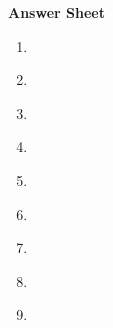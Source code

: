\documentclass[12pt]{article}
\begin{document}
\newpage

\newpage

\begin{center}
{\Large \textbf{Answer Sheet}}
\end{center}

\vspace{1cm}

\begin{center}
\begin{minipage}{0.4\textwidth}
\begin{enumerate}
\item \underline{\hspace{1.5cm}}

\vspace{0.6cm}

\item \underline{\hspace{1.5cm}}

\vspace{0.6cm}

\item \underline{\hspace{1.5cm}}

\vspace{0.6cm}

\item \underline{\hspace{1.5cm}}

\vspace{0.6cm}

\item \underline{\hspace{1.5cm}}

\vspace{0.6cm}

\item \underline{\hspace{1.5cm}}

\vspace{0.6cm}

\item \underline{\hspace{1.5cm}}

\vspace{0.6cm}

\item \underline{\hspace{1.5cm}}

\vspace{0.6cm}

\item \underline{\hspace{1.5cm}}


\end{enumerate}
\end{minipage}
\end{center}
\end{document}

